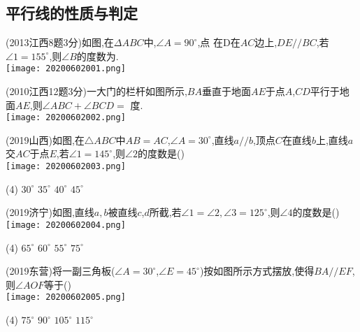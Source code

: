 \documentclass[cn,blue,12pt]{elegantbook}
\renewcommand \tkt[1]{{\CJKunderline[hidden=true, skip=true, thickness=1pt]{#1}}}
\begin{document}
\subsection{平行线的性质与判定}%
\begin{zhenti}[resume]
\item (2013江西8题3分)如图,在\(\Delta ABC\)中,\(\angle A=90^\circ\),点 在D在\(AC\)边上,\(DE // BC\),若\(\angle 1 =155 ^\circ \),则\(\angle B\)的度数为\tkt{\(65^\circ\)}.\\
\texttt{[image: 20200602001.png]}\\
\item (2010江西12题3分)一大门的栏杆如图所示,\(BA\)垂直于地面\(AE\)于点\(A\),\(CD\)平行于地面\(AE\),则\(\angle ABC + \angle BCD =\) \tkt{270}度.\\
\texttt{[image: 20200602002.png]}\\
\item (2019山西)如图,在\(\triangle ABC \)中\( AB=AC\),\(\angle A=30 ^\circ \),直线\(a // b\),顶点\(C\)在直线\(b\)上,直线\( a \)交\(AC\)于点\(E\),若\(\angle 1 = 145 ^\circ\),则\(\angle 2\)的度数是(\tkt{C})\\
\texttt{[image: 20200602003.png]}\\
  \begin{tasks}(4)
    \task \( 30^\circ \)
    \task \( 35^\circ\)
    \task \(40^\circ \)
    \task \( 45 ^\circ \)
  \end{tasks}
\item (2019济宁)如图,直线\(a,b\)被直线\(c\),\(d\)所截,若\(\angle 1 = \angle 2, \angle 3 = 125^\circ \),则\(\angle 4\)的度数是(\tkt{C})\\
\texttt{[image: 20200602004.png]}\\
  \begin{tasks}(4)
    \task \( 65^\circ \)
    \task \( 60^\circ \)
    \task \( 55^\circ \)
    \task \( 75 ^\circ \)
  \end{tasks}
\item (2019东营)将一副三角板(\(\angle A =30^\circ\),\( \angle E =45^\circ \))按如图所示方式摆放,使得\(BA // EF\),则\(\angle AOF\)等于(\tkt{A})\\
\texttt{[image: 20200602005.png]}\\
  \begin{tasks}(4)
    \task \(75^\circ\)
    \task \(90^\circ\)
    \task \(105^\circ\)
    \task \(115^\circ\)
  \end{tasks}
\end{zhenti}
\end{document}
